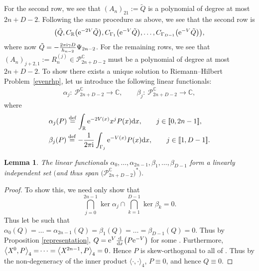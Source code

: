 \documentclass[pdftex]{sigma}
\numberwithin{equation}{section}
\newtheorem{Lemma}[Theorem]{Lemma}
\begin{document}
For the second row, we see that $(A_{n})_{21} := \tilde{Q}$ is a polynomial of degree at most $2n+D-2$. Following the same procedure as above, we see that the second row is
\begin{equation*}
\big( \tilde{Q} , C_{\mathbb{R}}\big({\rm e}^{-2V} \tilde{Q}\big) , C_{\Gamma_1}\big({\rm e}^{-V} \tilde{Q}\big) , \dots , C_{\Gamma_{D-1}}\big({\rm e}^{-V} \tilde{Q}\big)
\big),
\end{equation*}
where now $\tilde{Q} = - \frac{2\pi {\rm i} \gamma D}{h_{n-2}} \Psi_{2n-2}$. For the remaining rows, we see that $(A_n)_{j+2,1} := R^{(j)}_n \in \mathscr{P}^{\mathbb{C}}_{2n+D-2}$ must be a polynomial of degree at most $2n+D-2$. To show there exists a unique solution to Riemann--Hilbert Problem~\ref{evenrhp}, let us introduce the following linear functionals:
\begin{align*}
\alpha_j \colon\ \mathscr{P}^{\mathbb{C}}_{2n+D-2} \longrightarrow \mathbb{C},\qquad
\beta_j \colon\ \mathscr{P}^{\mathbb{C}}_{2n+D-2} \longrightarrow \mathbb{C},
\end{align*}
where
\begin{align}
&\alpha_j(P) \overset{\mathrm{def}}{=} \int_\mathbb{R} {\rm e}^{-2V(x)} x^j P(x) {\rm d}x,\qquad j \in [\![ 0, 2n-1 ]\!],\label{alpha} \\
&\beta_j(P) \overset{\mathrm{def}}{=} -\frac{1}{2\pi {\rm i}} \int_{\Gamma_j} {\rm e}^{-V(x)} P(x) {\rm d}x,\qquad j \in [\![ 1, D-1]\!]. \label{beta}
\end{align}
\begin{Lemma}\label{linindep}The linear functionals $\alpha_0, \dots, \alpha_{2n-1}, \beta_1, \dots, \beta_{D-1}$ form a linearly independent set $\big($and thus span $\big(\mathscr{P}_{2n+D-2}^{\mathbb{C}}\big)^\ast\big)$.
\end{Lemma}

\begin{proof}
To show this, we need only show that
\begin{equation*}
\bigcap_{j=0}^{2n-1} \ker \alpha_j \cap \bigcap_{k=1}^{D-1} \ker \beta_k = 0.
\end{equation*}
Thus let  be such that $\alpha_0(Q) = \dots = \alpha_{2n-1}(Q)= \beta_1(Q) = \dots = \beta_{D-1}(Q)=0$. Thus by Proposition \ref{representation}, $Q = {\rm e}^V \frac{\rm d}{{\rm d}x}\big( P {\rm e}^{-V}\big)$ for some . Furthermore, $\smash{\big\langle \mathit{X}^0, P \big\rangle_4 =} \dots = \big\langle \mathit{X}^{2n-1}, P \big\rangle_4 = 0$. Hence $P$ is skew-orthogonal to all of . Thus by the non-degeneracy of the inner product $\langle \cdot,\cdot \rangle_4$, $P \equiv 0$, and hence $Q \equiv 0$.
\end{proof}
\end{document}
